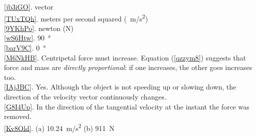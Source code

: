 \documentclass[main.tex]{subfiles}
\begin{document}
\ref{jb3iGO}. vector\\
\ref{TUxTQh}. meters per second squared (\SI{}{m/s^2})\\
\ref{9YKhPo}. newton (N)\\
\ref{wS6Htw}. \SI{90}{\degree}\\
\ref{barV9C}. \SI{0}{\degree}\\
\ref{M6NkHB}. Centripetal force must increase. Equation (\ref{qzzym8}) suggests that force and mass are \textit{directly proportional}: if one increases, the other goes increases too. \\
\ref{IAjJBC}. Yes. Although the object is not speeding up or slowing down, the direction of the velocity vector continuously changes. \\
\ref{G8I4Up}. In the direction of the tangential velocity at the instant the force was removed.\\
\ref{Kv8Old}. (a) \SI{10.24}{m/s^2} \hspace{1em} (b) \SI{911}{N}\\
\end{document}
